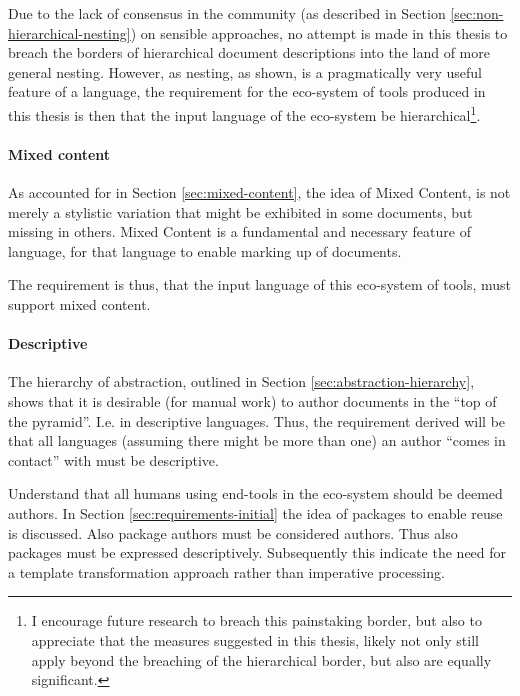 \documentclass{scrreprt}
\begin{document}
Due to the lack of consensus in the community (as described in Section \ref{sec:non-hierarchical-nesting}) on sensible approaches, no attempt is made in this thesis to breach the borders of hierarchical document descriptions into the land of more general nesting. However, as nesting, as shown, is a pragmatically very useful feature of a language, the requirement for the eco-system of tools produced in this thesis is then that the input language of the eco-system be hierarchical\footnote{I encourage future research to breach this painstaking border, but also to appreciate that the measures suggested in this thesis, likely not only still apply beyond the breaching of the hierarchical border, but also are equally significant.}.



\paragraph{Mixed content}
As accounted for in Section \ref{sec:mixed-content}, the idea of Mixed Content, is not merely a stylistic variation that might be exhibited in some documents, but missing in others. Mixed Content is a fundamental and necessary feature of language, for that language to enable marking up of documents.

The requirement is thus, that the input language of this eco-system of tools, must support mixed content.



\paragraph{Descriptive}
The hierarchy of abstraction, outlined in Section \ref{sec:abstraction-hierarchy}, shows that it is desirable (for manual work) to author documents in the ``top of the pyramid''. I.e. in descriptive languages. Thus, the requirement derived will be that all languages (assuming there might be more than one) an author ``comes in contact'' with must be descriptive.

Understand that all humans using end-tools in the eco-system should be deemed authors. In Section \ref{sec:requirements-initial} the idea of packages to enable reuse is discussed. Also package authors must be considered authors. Thus also packages must be expressed descriptively. Subsequently this indicate the need for a template transformation approach rather than imperative processing.
\end{document}
